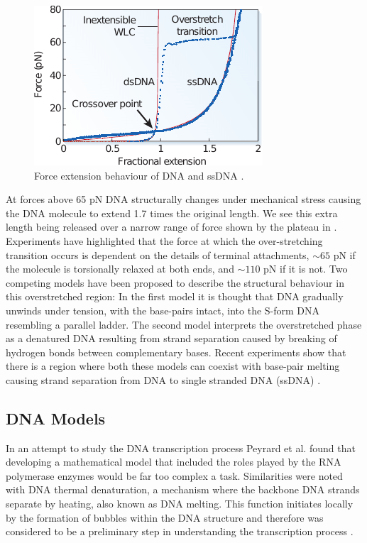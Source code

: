 %
\begin{figure}[htp]
\centering
\includegraphics[scale=1.5]{Graphics/DNA/fig1_Bustamante2003.pdf}
\caption{Force extension behaviour of DNA and ssDNA \cite{Bustamante2003}. }
\label{fig:fig1_Bustamante2003}
\end{figure}
%
At forces above 65 pN DNA structurally changes under mechanical stress causing the DNA molecule to extend 1.7 times the original length. We see this extra length being released over a narrow range of force shown by the plateau in . Experiments have highlighted that the force at which the over-stretching transition occurs is dependent on the details of terminal attachments, $\sim 65$ pN if the molecule is torsionally relaxed at both ends, and $\sim 110$ pN if it is not. Two competing models \cite{VanMameren2009} have been proposed to describe the structural behaviour in this overstretched region: In the first model it is thought that DNA gradually unwinds under tension, with the base-pairs intact, into the S-form DNA resembling a parallel ladder.  The second model interprets the overstretched phase as a denatured DNA resulting from strand separation caused by breaking of hydrogen bonds between complementary bases. Recent experiments show that there is a region where both these models can coexist with base-pair melting causing strand separation from DNA to single stranded DNA (ssDNA) \cite{VanMameren2009,Williams2009,Fu2010}. 

\subsection{DNA Models}

In an attempt to study the DNA transcription process Peyrard et al. \cite{Peyrard1989a} found that developing a mathematical model that included the roles played by the RNA polymerase enzymes would be far too complex a task. Similarities were noted with DNA thermal denaturation, a mechanism where the backbone DNA strands separate by heating, also known as DNA melting. This function initiates locally by the formation of bubbles within the DNA structure and therefore was considered to be a preliminary step in understanding the transcription process \cite{Peyrard1989a, Dauxois1993a, Dauxois1993, Peyrard2004}. 

